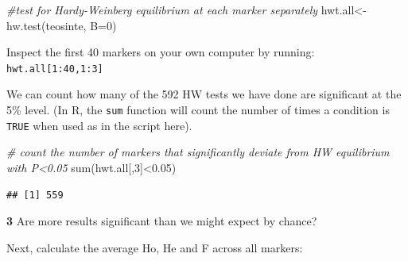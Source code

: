 \documentclass[
]{book}
\makeatletter
\newenvironment{Shaded}{\begin{snugshade}}{\end{snugshade}}
\newcommand{\AttributeTok}[1]{\textcolor[rgb]{0.77,0.63,0.00}{#1}}
\newcommand{\CommentTok}[1]{\textcolor[rgb]{0.56,0.35,0.01}{\textit{#1}}}
\newcommand{\DecValTok}[1]{\textcolor[rgb]{0.00,0.00,0.81}{#1}}
\newcommand{\FloatTok}[1]{\textcolor[rgb]{0.00,0.00,0.81}{#1}}
\newcommand{\FunctionTok}[1]{\textcolor[rgb]{0.00,0.00,0.00}{#1}}
\newcommand{\NormalTok}[1]{#1}
\newcommand{\OtherTok}[1]{\textcolor[rgb]{0.56,0.35,0.01}{#1}}
\newcommand{\SpecialCharTok}[1]{\textcolor[rgb]{0.00,0.00,0.00}{#1}}
\newenvironment{kframe}{%
\medskip{}
\setlength{\fboxsep}{.8em}
 \def\at@end@of@kframe{}%
 \ifinner\ifhmode%
  \def\at@end@of@kframe{\end{minipage}}%
  \begin{minipage}{\columnwidth}%
 \fi\fi%
 \def\FrameCommand##1{\hskip\@totalleftmargin \hskip-\fboxsep
 \colorbox{shadecolor}{##1}\hskip-\fboxsep
     \hskip-\linewidth \hskip-\@totalleftmargin \hskip\columnwidth}%
 \MakeFramed {\advance\hsize-\width
   \@totalleftmargin\z@ \linewidth\hsize
   \@setminipage}}%
 {\par\unskip\endMakeFramed%
 \at@end@of@kframe}
\newenvironment{rmdblock}[1]
  {
  \begin{itemize}
  \renewcommand{\labelitemi}{
    \raisebox{-.7\height}[0pt][0pt]{
      {\setkeys{Gin}{width=3em,keepaspectratio}\texttt{[image: images/\#1]}}
    }
  }
  \setlength{\fboxsep}{1em}
  \begin{kframe}
  \item
  }
  {
  \end{kframe}
  \end{itemize}
  }
\newenvironment{rmdquiz}
  {\begin{rmdblock}{quiz}}
  {\end{rmdblock}}
\makeatother
\begin{document}
\begin{Shaded}
\begin{Highlighting}[]
\CommentTok{\#test for Hardy{-}Weinberg equilibrium at each marker separately}
\NormalTok{hwt.all}\OtherTok{\textless{}{-}}\FunctionTok{hw.test}\NormalTok{(teosinte, }\AttributeTok{B=}\DecValTok{0}\NormalTok{)}
\end{Highlighting}
\end{Shaded}

Inspect the first 40 markers on your own computer by running: \texttt{hwt.all{[}1:40,1:3{]}}

We can count how many of the 592 HW tests we have done are significant at the 5\% level. (In R, the \texttt{sum} function will count the number of times a condition is \texttt{TRUE} when used as in the script here).

\begin{Shaded}
\begin{Highlighting}[]
\CommentTok{\# count the number of markers that significantly deviate from HW equilibrium with P\textless{}0.05}
\FunctionTok{sum}\NormalTok{(hwt.all[,}\DecValTok{3}\NormalTok{]}\SpecialCharTok{\textless{}}\FloatTok{0.05}\NormalTok{)}
\end{Highlighting}
\end{Shaded}

\begin{verbatim}
## [1] 559
\end{verbatim}

\begin{rmdquiz}
\textbf{3} Are more results significant than we might expect by chance?
\end{rmdquiz}

Next, calculate the average Ho, He and F across all markers:
\end{document}
